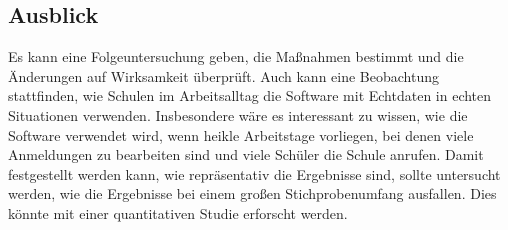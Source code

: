 \subsection{Ausblick}
Es kann eine Folgeuntersuchung geben, die Maßnahmen bestimmt und die Änderungen auf Wirksamkeit überprüft.
Auch kann eine Beobachtung stattfinden, wie Schulen im Arbeitsalltag die Software mit Echtdaten in echten Situationen verwenden. Insbesondere wäre es interessant zu wissen, wie die Software verwendet wird, wenn heikle Arbeitstage vorliegen, bei denen viele Anmeldungen zu bearbeiten sind und viele Schüler die Schule anrufen.
Damit festgestellt werden kann, wie repräsentativ die Ergebnisse sind, sollte untersucht werden, wie die Ergebnisse bei einem großen Stichprobenumfang ausfallen. Dies könnte mit einer quantitativen Studie erforscht werden.
